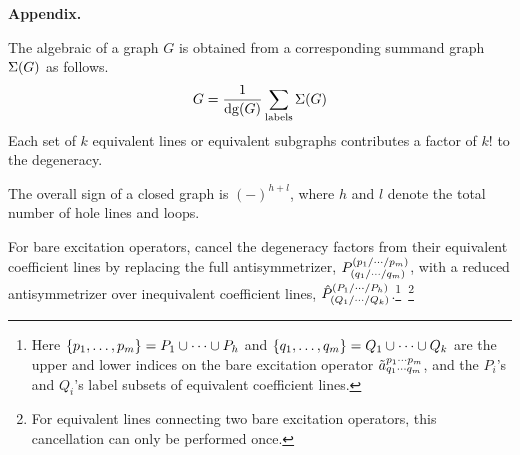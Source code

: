 \documentclass[11pt]{article}
\begin{document}
\vfill
\noindent
\hrulefill

\noindent
\textbf{Appendix.}
\vspace{10pt}

{\small

\noindent
{}
The algebraic of a graph $G$ is obtained from a corresponding summand graph $\Sigma (G)$ as follows.
\begin{align*}
  G
=
  \frac {1}{\mathrm{dg}(G)}
  \sum_{\mathrm{labels}}\Sigma (G)
\end{align*}
\noindent
{}
  Each set of $k$ equivalent lines or equivalent subgraphs contributes a factor of $k!$ to the degeneracy.

\noindent
{}
  The overall sign of a closed graph is $(-)^{h+l}$, where $h$ and $l$ denote the total number of hole lines and loops.

\noindent
{}
  For bare excitation operators, cancel the degeneracy factors from their equivalent coefficient lines by replacing the full antisymmetrizer, $P^{(p_1/\cdots/p_m)}_{(q_1/\cdots/q_m)}$, with a reduced antisymmetrizer over inequivalent coefficient lines, $\hat{P}^{(P_1/\cdots /P_h)}_{(Q_1/\cdots /Q_k)}$.\footnote{
  Here $\{p_1,\ldots,p_m\}=P_1\cup\cdots\cup P_h$ and $\{q_1,\ldots,q_m\}=Q_1\cup\cdots\cup Q_k$ are the upper and lower indices on the bare excitation operator $\tilde{a}^{p_1\cdots p_m}_{q_1\cdots q_m}$, and the $P_i$'s and $Q_i$'s label subsets of equivalent coefficient lines.
}~\footnote{
  For equivalent lines connecting two bare excitation operators, this cancellation can only be performed once.
}
}
\end{document}
